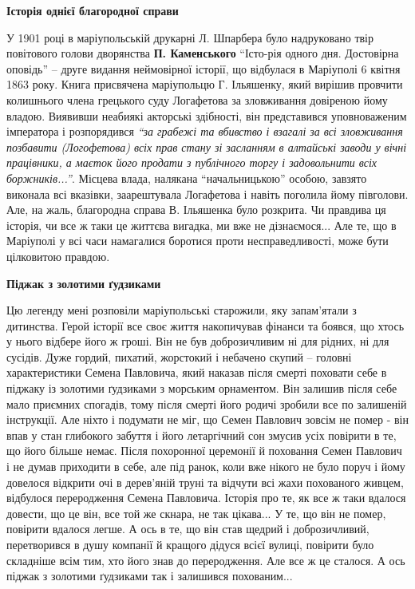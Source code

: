 \begin{center}
\textbf{Історія однієї благородної справи}
\end{center}

У 1901 році в маріупольській друкарні Л. Шпарбера було надруковано твір
повітового голови дворянства \textbf{П. Каменського} \enquote{Істо\hyp{}рія одного дня. Достовірна
оповідь} – друге видання неймовірної історії, що відбулася в Маріуполі 6 квітня
1863 року. Книга присвячена маріупольцю Г. Ільяшенку, який вирішив провчити
колишнього члена грецького суду Логафетова за зловживання довіреною йому
владою. Виявивши неабиякі акторські здібності, він представився уповноваженим
імператора і розпорядився \emph{\enquote{за грабежі та вбивство і взагалі за всі зловживання
позбавити (Логофетова) всіх прав стану зі засланням в алтайські заводи у вічні
працівники, а маєток його продати з публічного торгу і задовольнити всіх
боржників...}}. Місцева влада, налякана \enquote{начальницькою} особою, завзято виконала
всі вказівки, заарештувала Логафетова і навіть поголила йому півголови. Але, на
жаль, благородна справа В. Ільяшенка було розкрита. Чи правдива ця історія, чи
все ж таки це життєва вигадка, ми вже не дізнаємося... Але те, що в Маріуполі у
всі часи намагалися боротися проти несправедливості, може бути цілковитою
правдою.

\begin{center}
\textbf{Піджак з золотими ґудзиками}
\end{center}


Цю легенду мені розповіли маріупольські старожили, яку запам'ятали з дитинства.
Герой історії все своє життя накопичував фінанси та боявся, що хтось у нього
відбере його ж гроші. Він не був доброзичливим ні для рідних, ні для сусідів.
Дуже гордий, пихатий, жорстокий і небачено скупий – головні характеристики
Семена Павловича, який наказав після смерті поховати себе в піджаку із золотими
ґудзиками з морським орнаментом. Він залишив після себе мало приємних спогадів,
тому після смерті його родичі зробили все по залишеній інструкції. Але ніхто і
подумати не міг, що Семен Павлович зовсім не помер - він впав у стан глибокого
забуття і його летаргічний сон змусив усіх повірити в те, що його більше немає.
Після похоронної церемонії й поховання Семен Павлович і не думав приходити в
себе, але під ранок, коли вже нікого не було поруч і йому довелося відкрити очі
в дерев'яній труні та відчути всі жахи похованого живцем, відбулося
переродження Семена Павловича. Історія про те, як все ж таки вдалося довести,
що це він, все той же скнара, не так цікава... У те, що він не помер, повірити
вдалося легше. А ось в те, що він став щедрий і доброзичливий, перетворився в
душу компанії й кращого дідуся всієї вулиці, повірити було складніше всім тим,
хто його знав до переродження. Але все ж це сталося. А ось піджак з золотими
ґудзиками так і залишився похованим...

